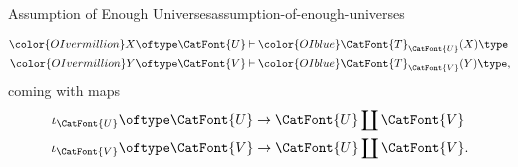 \begin{remark}{Assumption of Enough Universes}{assumption-of-enough-universes}
\begin{enumerate}
{                \par\vspace*{\TCBBoxCorrection}
            }%
            \begin{align*}
                {\color{OIvermillion}X\oftype\CatFont{U}} &\mathbin{\vdash} {\color{OIblue}\CatFont{T}_{\CatFont{U}}(X)\type}\\
                {\color{OIvermillion}Y\oftype\CatFont{V}} &\mathbin{\vdash} {\color{OIblue}\CatFont{T}_{\CatFont{V}}(Y)\type},
            \end{align*}
            coming with maps
            \begin{align*}
                \iota_{\CatFont{U}} &\oftype \CatFont{U}\to\CatFont{U}\coprod\CatFont{V}\\
                \iota_{\CatFont{V}} &\oftype \CatFont{V}\to\CatFont{U}\coprod\CatFont{V}.
            \end{align*}
    \end{enumerate}
\end{remark}
\begin{appendices}

\end{appendices}

